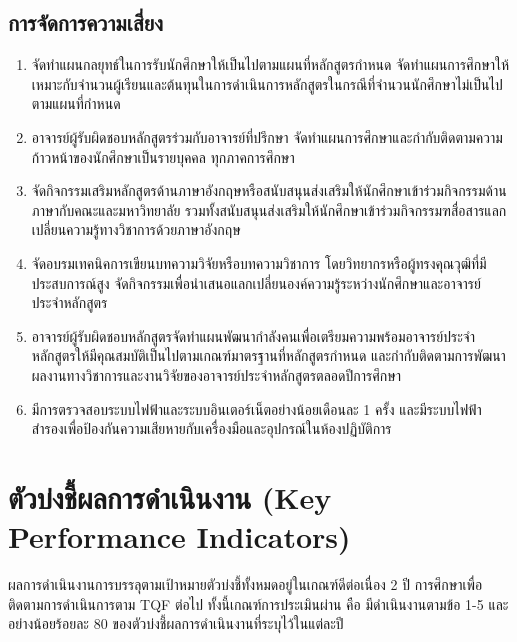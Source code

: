 \subsection{การจัดการความเสี่ยง}
 \begin{enumerate}  	
   	\item จัดทำแผนกลยุทธ์ในการรับนักศึกษาให้เป็นไปตามแผนที่หลักสูตรกำหนด จัดทำแผนการศึกษาให้เหมาะกับจำนวนผู้เรียนและต้นทุนในการดำเนินการหลักสูตรในกรณีที่จำนวนนักศึกษาไม่เป็นไปตามแผนที่กำหนด  
   	\item อาจารย์ผู้รับผิดชอบหลักสูตรร่วมกับอาจารย์ที่ปรึกษา จัดทำแผนการศึกษาและกำกับติดตามความก้าวหน้าของนักศึกษาเป็นรายบุคคล ทุกภาคการศึกษา
   	\item จัดกิจกรรมเสริมหลักสูตรด้านภาษาอังกฤษหรือสนับสนุนส่งเสริมให้นักศึกษาเข้าร่วมกิจกรรมด้านภาษากับคณะและมหาวิทยาลัย รวมทั้งสนับสนุนส่งเสริมให้นักศึกษาเข้าร่วมกิจกรรมฑสื่อสารแลกเปลี่ยนความรู้ทางวิชาการด้วยภาษาอังกฤษ
   	\item จัดอบรมเทคนิคการเขียนบทความวิจัยหรือบทความวิชาการ โดยวิทยากรหรือผู้ทรงคุณวุฒิที่มีประสบการณ์สูง จัดกิจกรรมเพื่อนำเสนอแลกเปลี่ยนองค์ความรู้ระหว่างนักศึกษาและอาจารย์ประจำหลักสูตร   	
   	\item อาจารย์ผู้รับผิดชอบหลักสูตรจัดทำแผนพัฒนากำลังคนเพื่อเตรียมความพร้อมอาจารย์ประจำหลักสูตรให้มีคุณสมบัติเป็นไปตามเกณฑ์มาตรฐานที่หลักสูตรกำหนด และกำกับติดตามการพัฒนาผลงานทางวิชาการและงานวิจัยของอาจารย์ประจำหลักสูตรตลอดปีการศึกษา
   	\item มีการตรวจสอบระบบไฟฟ้าและระบบอินเตอร์เน็ตอย่างน้อยเดือนละ 1 ครั้ง และมีระบบไฟฟ้าสำรองเพื่อป้องกันความเสียหายกับเครื่องมือและอุปกรณ์ในห้องปฏิบัติการ  	
   	   	\end{enumerate} 


\section{ตัวบ่งชี้ผลการดำเนินงาน (Key Performance Indicators)}
ผลการดำเนินงานการบรรลุตามเป้าหมายตัวบ่งชี้ทั้งหมดอยู่ในเกณฑ์ดีต่อเนื่อง 2 ปี การศึกษาเพื่อติดตามการดำเนินการตาม TQF ต่อไป ทั้งนี้เกณฑ์การประเมินผ่าน คือ มีดำเนินงานตามข้อ 1-5 และอย่างน้อยร้อยละ 80 ของตัวบ่งชี้ผลการดำเนินงานที่ระบุไว้ในแต่ละปี	

